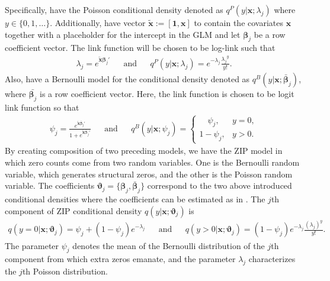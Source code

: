 \documentclass[12pt,letterpaper]{article}
\numberwithin{equation}{section}
\numberwithin{equation}{section}
\numberwithin{equation}{section}
\newcommand{\xTilda}{\tilde{\bm{x}}}
\begin{document}
Specifically, have the Poisson conditional density  denoted as $ q^P(y|\bm{x}; \lambda_j) $ where $y \in \{0,1,\dots\}$. Additionally, have vector $\xTilda := [\bm{1},\bm{x}]$ to contain the covariates $\bm{x}$ together with a placeholder for the intercept in the GLM and let $\bm{\beta}_j$ be a row coefficient vector.
The link function will be chosen to be log-link such that
 \begin{align}\label{g1link}
\lambda_j = e^{\xTilda \bm{\beta}_j'} && \text{and} & & %
q^P(y|\bm{ x} ; \lambda_{j} ) = e^{-\lambda_j} \frac{{\lambda_j}^y}{y!}.
 \end{align}
Also, have a Bernoulli model for the conditional density denoted as $ q^{B}(y|\bm{x}; \bm{\bar{\beta}}_j) $, where $\bar{\bm{\beta}_j}$ is a row coefficient vector.  Here, the link function is chosen to be logit link function so that
 \begin{align}\label{g2link}
 \psi_j =  \frac{e^{\xTilda \bm{\bar{\beta}}_j'}}{1+ e^{\xTilda  \bm{\bar{\beta}}_j'}}  && \text{and} && 
 q^B(y | \bm{x} ; {\psi}_j) = \begin{cases}
      \quad \psi_j, & y = 0,\\
     1 -  \psi_j,  & y > 0.
   \end{cases}
 \end{align}
By creating composition of two preceding models, we have the ZIP model in which zero counts come from two random variables. One is the Bernoulli random variable, which generates structural zeros, and the other is the Poisson random variable. The coefficients $\bm{\vartheta}_{j}=\{ \bm{\beta}_{j},  \bm{\bar{\beta}}_j \}$ correspond to the two above introduced conditional densities where the coefficients can be estimated as in \cite{Lambert}. The $j$th component of ZIP conditional density $q(y|\bm{x}; \bm{\vartheta}_{j}  )$ is %
 \begin{align*}
 q( y = 0| \bm{x} ; \bm{ \vartheta}_{j}  ) = \psi_j + (1 - \psi_j)e^{-\lambda_j}  & &  \text{and}  & &
q(y > 0 |  \bm{x} ; \bm{ \vartheta}_{j}  ) = (1 - \psi_j)e^{-\lambda_j} \frac{\left(\lambda_j \right)^y  }{y!}.
 \end{align*}
The parameter $\psi_j$ denotes the mean of the Bernoulli distribution of the $j$th component from which extra zeros emanate, and the parameter $ \lambda_j $ characterizes the $j$th Poisson distribution. 
\end{document}
